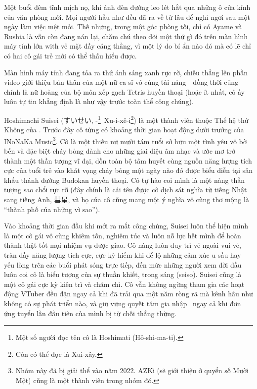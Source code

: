 \documentclass[../main.tex]{subfiles}
\begin{document}

Một buổi đêm tĩnh mịch nọ, khi ánh đèn đường leo lét hắt qua những ô cửa kính của văn phòng mới. Mọi người hầu như đều đã ra về từ lâu để nghỉ ngơi sau một ngày làm việc mệt mỏi. Thế nhưng, trong một góc phòng tối, chỉ có Ayame và Rushia là vẫn còn đang nán lại, chăm chú theo dõi một thứ gì đó trên màn hình máy tính lớn with vẻ mặt đầy căng thẳng, vì một lý do bí ẩn nào đó mà có lẽ chỉ có hai cô gái trẻ mới có thể thấu hiểu được.


Màn hình máy tính đang tỏa ra thứ ánh sáng xanh rực rỡ, chiếu thẳng lên phần video giới thiệu bản thân của một nữ ca sĩ vô cùng tài năng - đồng thời cũng chính là nữ hoàng của bộ môn xếp gạch Tetris huyền thoại (hoặc ít nhất, cô ấy luôn tự tin khẳng định là như vậy trước toàn thể công chúng).

\chrint

Hoshimachi Suisei (すいせい, -\footnote{Một số người đọc tên cô là Hoshimati (Hô-shi-ma-ti).}\ Xu-i-xê-i\footnote{Còn có thể đọc là Xui-xây.}) là một thành viên thuộc Thế hệ thứ Không của \hll. Trước đây cô từng có khoảng thời gian hoạt động dưới trướng của INoNaKa Music\footnote{Nhóm này đã bị giải thể vào năm 2022. AZKi (sẽ giới thiệu ở quyển số Mười Một) cũng là một thành viên trong nhóm đó.}. Cô là một thiếu nữ mười tám tuổi sở hữu một tình yêu vô bờ bến và đặc biệt cháy bỏng dành cho những giai điệu âm nhạc và ước mơ trở thành một thần tượng vĩ đại, dồn toàn bộ tâm huyết cùng nguồn năng lượng tích cực của tuổi trẻ vào khát vọng cháy bỏng một ngày nào đó được biểu diễn tại sân khấu thánh đường Budokan huyền thoại. Cô tự hào coi mình là một nàng thần tượng sao chổi rực rỡ (đây chính là cái tên được cô dịch sát nghĩa từ tiếng Nhật sang tiếng Anh, 彗星, và họ của cô cũng mang một ý nghĩa vô cùng thơ mộng là ``thành phố của những vì sao'').

Vào khoảng thời gian đầu khi mới ra mắt công chúng, Suisei luôn thể hiện mình là một cô gái vô cùng khiêm tốn, nghiêm túc và luôn nỗ lực hết mình để hoàn thành thật tốt mọi nhiệm vụ được giao. Cô nàng luôn duy trì vẻ ngoài vui vẻ, tràn đầy năng lượng tích cực, cực kỳ hiếm khi để lộ những cảm xúc u sầu hay yếu lòng trên các buổi phát sóng trực tiếp, đến mức những người xem đời đầu luôn coi cô là biểu tượng của sự thuần khiết, trong sáng (seiso). Suisei cũng là một cô gái cực kỳ kiên trì và chăm chỉ. Cô vẫn không ngừng tham gia các hoạt động VTuber đều đặn ngay cả khi đã trải qua một năm ròng rã mà kênh hầu như không có sự phát triển nào, và giữ vững quyết tâm gia nhập \hll\ ngay cả khi đơn ứng tuyển lần đầu tiên của mình bị từ chối thẳng thừng.
\end{document}

